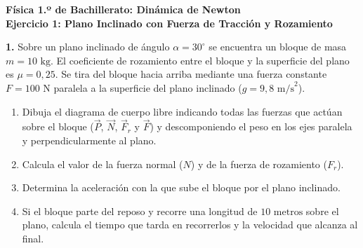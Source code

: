 ﻿\documentclass[11pt,a4paper]{article}
\begin{document}
\pagestyle{empty}

\begin{center}
    {\LARGE \textbf{Física 1.º de Bachillerato: Dinámica de Newton}}\\[4pt]
    {\large \textbf{Ejercicio 1: Plano Inclinado con Fuerza de Tracción y Rozamiento}}
\end{center}

\vspace{0.4cm}
\noindent\textbf{1.} Sobre un plano inclinado de ángulo $\alpha = 30^\circ$ se encuentra un bloque de masa $m = 10\text{ kg}$. El coeficiente de rozamiento entre el bloque y la superficie del plano es $\mu = 0{,}25$. Se tira del bloque hacia arriba mediante una fuerza constante $F = 100\text{ N}$ paralela a la superficie del plano inclinado ($g = 9{,}8\text{ m/s}^2$).

\begin{center}
\end{center}

\begin{enumerate}[label=\textbf{\alph*)}, leftmargin=2em, itemsep=8pt]
    \item Dibuja el diagrama de cuerpo libre indicando todas las fuerzas que actúan sobre el bloque ($\vec{P}$, $\vec{N}$, $\vec{F}_r$ y $\vec{F}$) y descomponiendo el peso en los ejes paralela y perpendicularmente al plano.
    \item Calcula el valor de la fuerza normal ($N$) y de la fuerza de rozamiento ($F_r$).
    \item Determina la aceleración con la que sube el bloque por el plano inclinado.
    \item Si el bloque parte del reposo y recorre una longitud de $10\text{ metros}$ sobre el plano, calcula el tiempo que tarda en recorrerlos y la velocidad que alcanza al final.
\end{enumerate}
\end{document}
